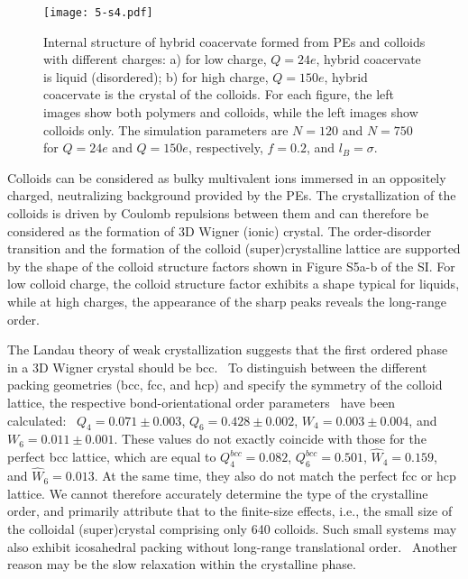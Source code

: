 \documentclass[journal=mamobx, manuscript=article]{achemso}
\begin{document}
\begin{figure}[ht]
\centering
\texttt{[image: 5-s4.pdf]}
\caption{Internal structure of hybrid coacervate formed from PEs and colloids with different charges: a) for low charge, $Q = 24e$, hybrid coacervate is liquid (disordered); b) for high charge, $Q=150e$, hybrid coacervate is the crystal of the colloids. For each figure, the left images show both polymers and colloids, while the left images show colloids only. The simulation parameters are $N = 120$ and $N=750$ for $Q = 24e$ and $Q=150e$, respectively, $f = 0.2$, and $l_{B} = \sigma$. }
\label{fig:snap-order}
\end{figure}

Colloids can be considered as bulky multivalent ions immersed in an oppositely charged, neutralizing background provided by the PEs. The crystallization of the colloids is driven by Coulomb repulsions between them and can therefore be considered as the formation of 3D Wigner (ionic) crystal. The order-disorder transition and the formation of the colloid (super)crystalline lattice are supported by the shape of the colloid structure factors shown in Figure S5a-b of the SI. For low colloid charge, the colloid structure factor exhibits a shape typical for liquids, while at high charges, the appearance of the sharp peaks reveals the long-range order. 

The Landau theory of weak crystallization suggests that the first ordered phase in a 3D Wigner crystal should be bcc.~\cite{alexander1978} To distinguish between the different packing geometries (bcc, fcc, and hcp) and specify the symmetry of the colloid lattice, the respective bond-orientational order parameters~\cite{nelson1983} have been calculated:~\cite{dellago2005} $Q_4 = 0.071 \pm 0.003$, $Q_6 = 0.428 \pm 0.002$, $W_4 = 0.003 \pm 0.004 $, and $W_6 = 0.011 \pm 0.001$. These values do not exactly coincide with those for the perfect bcc lattice, which are equal to $Q_4^{bcc} = 0.082$, $Q_6^{bcc} = 0.501$, $\hat{W}_4 = 0.159$, and $\hat{W}_6 = 0.013$. At the same time, they also do not match the perfect fcc or hcp lattice. We cannot therefore accurately determine the type of the crystalline order, and primarily attribute that to the finite-size effects, i.e., the small size of the colloidal (super)crystal comprising only 640 colloids. Such small systems may also exhibit icosahedral packing without long-range translational order.~\cite{nelson1983} Another reason may be the slow relaxation within the crystalline phase.
\end{document}
